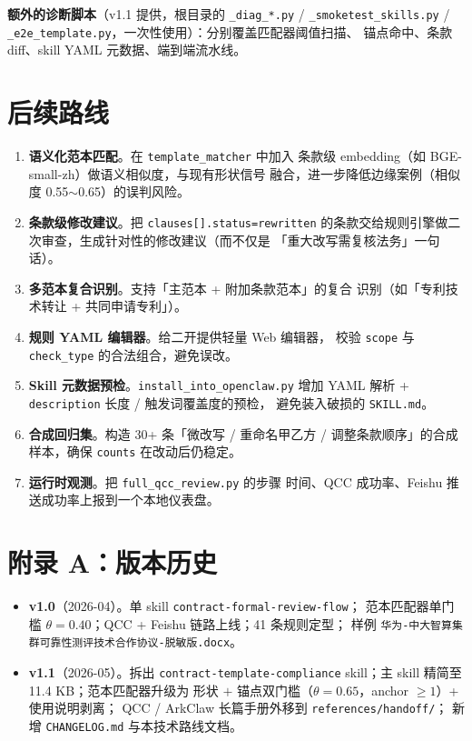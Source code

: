 \documentclass[11pt,a4paper]{article}
\begin{document}
\textbf{额外的诊断脚本}（v1.1 提供，根目录的
\texttt{\_diag\_*.py} / \texttt{\_smoketest\_skills.py} /
\texttt{\_e2e\_template.py}，一次性使用）：分别覆盖匹配器阈值扫描、
锚点命中、条款 diff、skill YAML 元数据、端到端流水线。

\section{后续路线}

\begin{enumerate}[leftmargin=1.4em,itemsep=2pt]
  \item \textbf{语义化范本匹配}。在 \texttt{template\_matcher} 中加入
    条款级 embedding（如 BGE-small-zh）做语义相似度，与现有形状信号
    融合，进一步降低边缘案例（相似度 0.55$\sim$0.65）的误判风险。
  \item \textbf{条款级修改建议}。把 \texttt{clauses[].status=rewritten}
    的条款交给规则引擎做二次审查，生成针对性的修改建议（而不仅是
    「重大改写需复核法务」一句话）。
  \item \textbf{多范本复合识别}。支持「主范本 + 附加条款范本」的复合
    识别（如「专利技术转让 + 共同申请专利」）。
  \item \textbf{规则 YAML 编辑器}。给二开提供轻量 Web 编辑器，
    校验 \texttt{scope} 与 \texttt{check\_type} 的合法组合，避免误改。
  \item \textbf{Skill 元数据预检}。\texttt{install\_into\_openclaw.py}
    增加 YAML 解析 + \texttt{description} 长度 / 触发词覆盖度的预检，
    避免装入破损的 \texttt{SKILL.md}。
  \item \textbf{合成回归集}。构造 30+ 条「微改写 / 重命名甲乙方 /
    调整条款顺序」的合成样本，确保 \texttt{counts} 在改动后仍稳定。
  \item \textbf{运行时观测}。把 \texttt{full\_qcc\_review.py} 的步骤
    时间、QCC 成功率、Feishu 推送成功率上报到一个本地仪表盘。
\end{enumerate}

\section*{附录 A：版本历史}

\begin{itemize}[leftmargin=1.4em,itemsep=2pt]
  \item \textbf{v1.0}（2026-04）。单 skill \texttt{contract-formal-review-flow}；
    范本匹配器单门槛 $\theta=0.40$；QCC + Feishu 链路上线；41 条规则定型；
    样例 \texttt{华为-中大智算集群可靠性测评技术合作协议-脱敏版.docx}。
  \item \textbf{v1.1}（2026-05）。拆出 \texttt{contract-template-compliance}
    skill；主 skill 精简至 11.4 KB；范本匹配器升级为
    形状 $+$ 锚点双门槛（$\theta=0.65$，anchor $\ge 1$）+ 使用说明剥离；
    QCC / ArkClaw 长篇手册外移到 \texttt{references/handoff/}；
    新增 \texttt{CHANGELOG.md} 与本技术路线文档。
\end{itemize}
\end{document}
